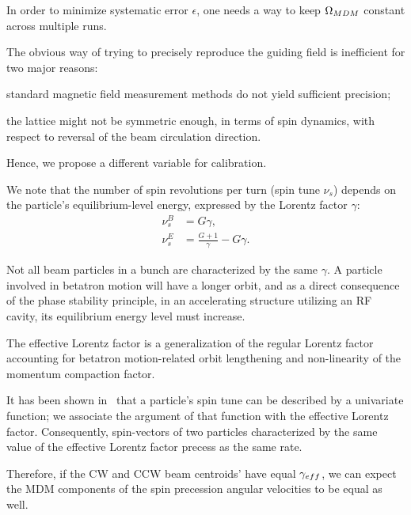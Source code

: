 In order to minimize systematic error $\epsilon$, one needs a way to keep $\Omega_{MDM}$ constant across multiple runs.

The obvious way of trying to precisely reproduce the guiding field is inefficient for two major reasons:
\begin{enumerate*}[(1)]
	\item standard magnetic field measurement methods do not yield sufficient precision;
	\item the lattice might not be symmetric enough, in terms of spin dynamics, with respect to reversal of the beam circulation direction.
\end{enumerate*}
Hence, we propose a different variable for calibration.

We note that the number of spin revolutions per turn (spin tune $\nu_s$) depends on the particle's  equilibrium-level energy, expressed by the Lorentz factor $\gamma$:
\begin{align}\label{eq:spin_tune_vs_gamma}
\nu_s^B &= G\gamma, \tag{magnetic field}\\
\nu_s^E &= \frac{G+1}{\gamma} - G\gamma. \tag{electric field}
\end{align}

Not all beam particles in a bunch are characterized by the same $\gamma$. A particle involved in betatron
motion will have a longer orbit, and as a direct consequence of the phase stability principle,
in an accelerating structure utilizing an RF cavity, its equilibrium energy level 
must increase.

The effective Lorentz factor is a generalization of the regular Lorentz factor accounting for betatron motion-related orbit lengthening and non-linearity of the momentum compaction factor.

It has been shown in~\cite[p.~56]{Aksentev:Thesis} that a particle's spin tune can be described by a univariate function; we associate the argument of that function with the effective Lorentz factor. Consequently, spin-vectors of two particles characterized by the same value of the effective Lorentz factor precess as the same rate.

Therefore, if the CW and CCW beam centroids' have equal $\gamma_{eff}$, we can expect the MDM components of the spin precession angular velocities to be equal as well.
